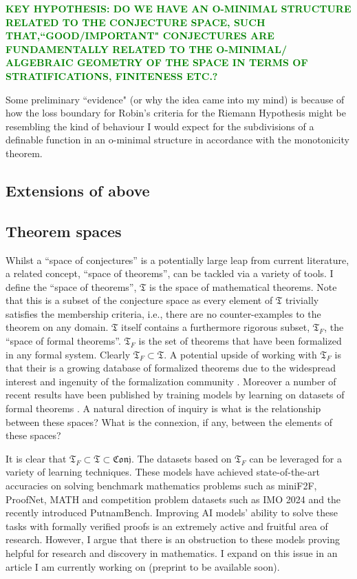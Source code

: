 \textcolor{green}{\textbf{KEY HYPOTHESIS: DO WE HAVE AN O-MINIMAL STRUCTURE RELATED TO THE CONJECTURE SPACE, SUCH THAT,``GOOD/IMPORTANT" CONJECTURES 
ARE FUNDAMENTALLY RELATED TO THE O-MINIMAL/ ALGEBRAIC GEOMETRY OF THE SPACE IN TERMS OF STRATIFICATIONS, FINITENESS ETC.?}
}

Some preliminary ``evidence" (or why the idea came into my mind) is because of how the loss boundary for Robin's criteria for the Riemann Hypothesis might be resembling the kind of behaviour I would expect for the subdivisions of a definable function in an o-minimal structure in accordance with the monotonicity theorem.

\subsection{Extensions of above}

\subsection{Theorem spaces}
Whilst a ``space of conjectures'' is a potentially large leap from current literature, a related concept, ``space of theorems'', can be tackled via a variety of tools.
I define the ``space of theorems'', $\mathfrak{T}$ is the space of mathematical theorems. Note that this is a subset of the conjecture space as every element of $\mathfrak{T}$ trivially satisfies the membership criteria, i.e.,
there are no counter-examples to the theorem on any domain.
$\mathfrak{T}$ itself contains a furthermore rigorous subset, $\mathfrak{T}_F$, the ``space of formal theorems''. $\mathfrak{T}_F$ is the set of theorems that have been formalized in any formal system. Clearly $\mathfrak{T}_F\subset\mathfrak{T}$. A potential upside of working with $\mathfrak{T}_F$ is that their is a growing database of formalized theorems due to the widespread interest and ingenuity of the formalization community \cite{formalization_examples}.
Moreover a number of recent results have been published by training models by learning on datasets of formal theorems \cite{Deepmind_stuff}. A natural direction of inquiry is what is the relationship between these spaces? What is the connexion, if any, between the elements of these spaces?
\\\par
It is clear that $\mathfrak{T}_F\subset\mathfrak{T}\subset\mathfrak{Conj}$. The datasets based on $\mathfrak{T}_F$ can be leveraged for a variety of learning techniques. These models have achieved state-of-the-art accuracies on solving benchmark mathematics problems such as miniF2F, ProofNet, MATH and competition problem datasets such as IMO 2024 and the recently introduced PutnamBench. Improving AI models' ability to solve these tasks with formally verified proofs
is an extremely active and fruitful area of research. However, I argue that there is an obstruction to these models proving helpful for research and discovery in mathematics. I expand on this issue in an article I am currently working on (preprint to be available soon). 

